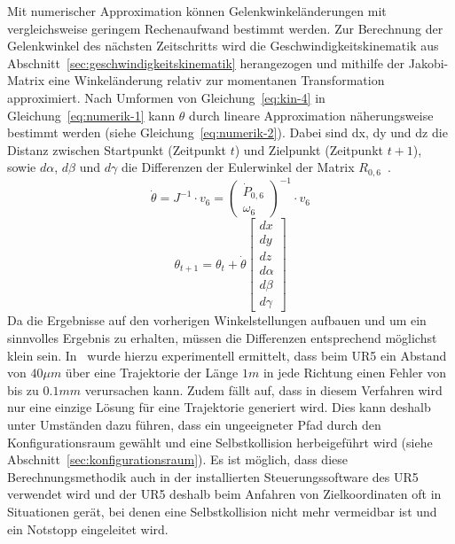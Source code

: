 Mit numerischer Approximation können Gelenkwinkeländerungen mit vergleichsweise geringem Rechenaufwand bestimmt werden.
Zur Berechnung der Gelenkwinkel des nächsten Zeitschritts wird die Geschwindigkeitskinematik aus Abschnitt~\ref{sec:geschwindigkeitskinematik} herangezogen und mithilfe der Jakobi-Matrix eine Winkeländerung relativ zur momentanen Transformation approximiert.
Nach Umformen von Gleichung~\ref{eq:kin-4} in Gleichung~\ref{eq:numerik-1} kann $\theta$ durch lineare Approximation näherungsweise bestimmt werden (siehe Gleichung~\ref{eq:numerik-2}).
Dabei sind dx, dy und dz die Distanz zwischen Startpunkt (Zeitpunkt $t$) und Zielpunkt (Zeitpunkt $t+1$), sowie $d\alpha$, $d\beta$ und $d\gamma$ die Differenzen der Eulerwinkel der Matrix $R_{0,6}$~\cite[123]{sicilianoRobotics2009}.
\begin{equation}
    \dot{\theta} =  J^{-1} \cdot v_6 =
    \begin{pmatrix}
        \dot{P}_{0,6} \\ \omega_6
    \end{pmatrix}^{-1} \cdot v_6
    \label{eq:numerik-1}
\end{equation}
\begin{equation}
    \theta_{t+1} = \theta_t + \dot{\theta}
    \begin{bmatrix}
        dx \\ dy \\ dz \\ d\alpha \\ d\beta \\ d\gamma
    \end{bmatrix}
    \label{eq:numerik-2}
\end{equation}
Da die Ergebnisse auf den vorherigen Winkelstellungen aufbauen und um ein sinnvolles Ergebnis zu erhalten, müssen die Differenzen entsprechend möglichst klein sein.
In~\cite{degierControlRoboticArm2015} wurde hierzu experimentell ermittelt, dass beim UR5 ein Abstand von $40\mu m$ über eine Trajektorie der Länge $1m$ in jede Richtung einen Fehler von bis zu $0.1mm$ verursachen kann.
Zudem fällt auf, dass in diesem Verfahren wird nur eine einzige Lösung für eine Trajektorie generiert wird.
Dies kann deshalb unter Umständen dazu führen, dass ein ungeeigneter Pfad durch den Konfigurationsraum gewählt und eine Selbstkollision herbeigeführt wird (siehe Abschnitt~\ref{sec:konfigurationsraum}).
Es ist möglich, dass diese Berechnungsmethodik auch in der installierten Steuerungssoftware des UR5 verwendet wird und der UR5 deshalb beim Anfahren von Zielkoordinaten oft in Situationen gerät, bei denen eine Selbstkollision nicht mehr vermeidbar ist und ein Notstopp eingeleitet wird.


